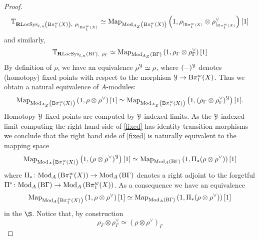 \documentclass[10pt,a4paper]{amsart}
\numberwithin{equation}{subsection}
\theoremstyle{plain}
\theoremstyle{definition}
\theoremstyle{remark}
\numberwithin{equation}{section}
\begin{document}
\begin{proof}
\begin{equation}
		\mathbb T_{\mathbf R \mathrm{LocSys}_{\ell, n} \left( \mathrm B \pi_1^w(X) \right),  \ \rho_{|_{\mathrm B \pi_1^w(X)}}} \simeq \mathrm{Map}_{\mathrm{Mod}_{A_Z} \left(\mathrm B \pi_1^w(X)\right) } \left( 1 ,  \rho_{|_{\mathrm B \pi_1^w(X)} }  \otimes \rho_{|_{\mathrm B \pi_1^w(X)}}^{\vee} \right) [1]
	\end{equation}
and similarly,
	\begin{equation}
		\mathbb T_{\mathbf R \mathrm{LocSys}_{\ell, n} \left( \mathrm B \Gamma \right), \ \rho_{\Gamma}} \simeq \mathrm{Map}_{\mathrm{Mod}_{A_Z} \left(\mathrm B \Gamma \right) } \left( 1 ,  \rho_{\Gamma} \otimes \rho_{\Gamma}^{\vee} \right) [1]
	\end{equation}
By definition of $\rho$, we have an equivalence $\rho^\mathcal Y \simeq \rho$, where $(-)^\mathcal Y$ denotes (homotopy) fixed points with respect to the morphism $\mathcal Y \to \mathrm B \pi_1^w(X)$. Thus we obtain a natural equivalence of $A$-modules:
	\begin{equation} \label{fixed}
		 \mathrm{Map}_{\mathrm{Mod}_{A_Z} \left(\mathrm B \pi_1^w(X)\right) } \left( 1 ,  \rho \otimes \rho^{\vee} \right) [1] \simeq \mathrm{Map}_{\mathrm{Mod}_{A_Z} \left(\mathrm B \pi_1^w(X) \right) } \left( 1 , (  \rho_{\Gamma} \otimes \rho_{\Gamma}^{\vee} )^\mathcal Y \right) [1].
	\end{equation}
Homotopy $\mathcal Y$-fixed points are computed by $\mathcal Y$-indexed limits.
As the $\mathcal Y$-indexed limit computing the right hand side of \eqref{fixed} has identity transition morphisms we conclude that the right hand side of \eqref{fixed} is naturally equivalent to the mapping space
	\begin{equation}
		 \mathrm{Map}_{\mathrm{Mod}_A \left(\mathrm B \pi_1^w(X) \right) } \left( 1 , (  \rho \otimes \rho^{\vee} )^\mathcal Y \right) [1] \simeq \mathrm{Map}_{\mathrm{Mod}_A \left(\mathrm B \Gamma \right) } \left( 1 , \Pi_*(  \rho \otimes \rho^{\vee} ) \right) [1]
	\end{equation}
where $\Pi_* \colon \mathrm{Mod}_A \left(\mathrm B \pi_1^w(X)\right)  \to \mathrm{Mod}_A \left( \mathrm B \Gamma \right) $ denotes a right adjoint to the forgetful $\Pi^* \colon \mathrm{Mod}_A \left( \mathrm B \Gamma \right) \to \mathrm{Mod}_A \left( \mathrm B \pi_1^w(X) \right)$. 
As a consequence we have an equivalence
 	\begin{equation}
		 \mathrm{Map}_{\mathrm{Mod}_A \left(\mathrm B \pi_1^w(X)\right) } \left(1 ,  \rho \otimes \rho^{\vee}  \right) [1] \simeq \mathrm{Map}_{ \mathrm{Mod}_A \left(\mathrm B \Gamma \right) } \left( 1 , \Pi_*(  \rho \otimes \rho^{\vee} ) \right) [1]
	\end{equation}
in the \infcat $\S$. Notice that, by construction
	\begin{equation} \label{eq:gamma}
		\rho_{\Gamma} \otimes \rho_{\Gamma}^{\vee} \simeq \left( \rho \otimes \rho^{\vee} \right)_{\Gamma}

\end{equation}
\end{proof}
\end{document}
